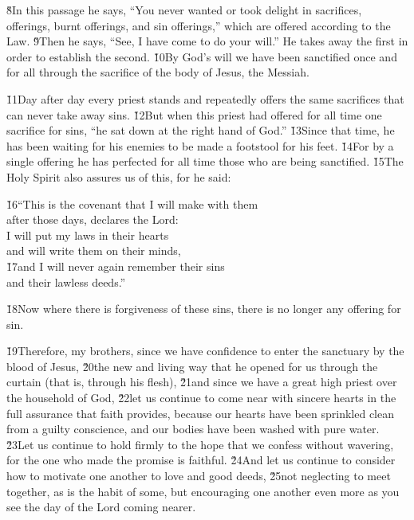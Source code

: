 \v{8}In this passage he says, ``You never wanted or took delight in sacrifices, offerings, burnt offerings, and sin offerings,'' which are offered according to the Law. \v{9}Then he says, ``See, I have come to do your will.'' He takes away the first in order to establish the second. \v{10}By God's will we have been sanctified once and for all through the sacrifice of the body of Jesus, the Messiah.

\v{11}Day after day every priest stands and repeatedly offers the same sacrifices that can never take away sins. \v{12}But when this priest had offered for all time one sacrifice for sins, ``he sat down at the right hand of God.'' \v{13}Since that time, he has been waiting for his enemies to be made a footstool for his feet. \v{14}For by a single offering he has perfected for all time those who are being sanctified. \v{15}The Holy Spirit also assures us of this, for he said:

\begin{poetry}
\poeml \v{16}``This is the covenant that I will make with them \\
\poemll    after those days, declares the Lord: \\
\poeml I will put my laws in their hearts \\
\poemll    and will write them on their minds, \\
\poeml \v{17}and I will never again remember their sins \\
\poemll    and their lawless deeds.''
\end{poetry}

\v{18}Now where there is forgiveness of these sins, there is no longer any offering for sin.

\v{19}Therefore, my brothers, since we have confidence to enter the sanctuary by the blood of Jesus, \v{20}the new and living way that he opened for us through the curtain (that is, through his flesh), \v{21}and since we have a great high priest over the household of God, \v{22}let us continue to come near with sincere hearts in the full assurance that faith provides, because our hearts have been sprinkled clean from a guilty conscience, and our bodies have been washed with pure water. \v{23}Let us continue to hold firmly to the hope that we confess without wavering, for the one who made the promise is faithful. \v{24}And let us continue to consider how to motivate one another to love and good deeds, \v{25}not neglecting to meet together, as is the habit of some, but encouraging one another even more as you see the day of the Lord coming nearer.

